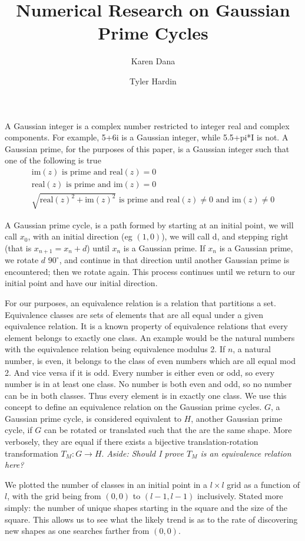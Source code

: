 \documentclass{article}
\title{Numerical Research on Gaussian Prime Cycles}
\author{Karen Dana \and Tyler Hardin}
\begin{document}
	\maketitle
	
A Gaussian integer is a complex number restricted to integer real and complex components. For example, 5+6i is a Gaussian integer, while 5.5+pi*I is not. A Gaussian prime, for the purposes of this paper, is a Gaussian integer such that one of the following is true
\begin{gather*}
  \mbox{im}(z) \mbox{ is prime and } \mbox{real}(z) = 0 \\
  \mbox{real}(z) \mbox{ is prime and } \mbox{im}(z) = 0 \\
  \sqrt{\mbox{real}(z)^2 + \mbox{im}(z)^2} \mbox{ is prime and } \mbox{real}(z) \neq 0 \mbox{ and } \mbox{im}(z) \neq 0
\end{gather*}
  
A Gaussian prime cycle, is a path formed by starting at an initial point, we will call $x_0$, with an initial direction (eg $(1,0)$), we will call d, and stepping right (that is $x_{n+1}=x_n + d$) until $x_n$ is a Gaussian prime. If $x_n$ is a Gaussian prime, we rotate $d$ $90^{\circ}$, and continue in that direction until another Gaussian prime is encountered; then we rotate again. This process continues until we return to our initial point and have our initial direction.

For our purposes, an equivalence relation is a relation that partitions a set. 
Equivalence classes are sets of elements that are all equal under a given equivalence relation. It is a known property of equivalence relations that every element belongs to exactly one class.
An example would be the natural numbers with the equivalence relation being equivalence modulus 2.
If $n$, a natural number, is even, it belongs to the class of even numbers which are all equal mod 2.
And vice versa if it is odd. Every number is either even or odd, so every number is in at least one class. No number is both even and odd, so no number can be in both classes. Thus every element is in exactly one class.
We use this concept to define an equivalence relation on the Gaussian prime cycles.
$G$, a Gaussian prime cycle, is considered equivalent to $H$, another Gaussian prime cycle, if $G$ can be rotated or translated such that the are the same shape.
More verbosely, they are equal if there exists a bijective translation-rotation transformation $T_M:G \to H$. \textit{Aside: Should I prove $T_M$ is an equivalence relation here?}

We plotted the number of classes in an initial point in a $l \times l$ grid as a function of $l$, with the grid being from $(0,0)$ to $(l-1,l-1)$ inclusively. Stated more simply: the number of unique shapes starting in the square and the size of the square. This allows us to see what the likely trend is as to the rate of discovering new shapes as one searches farther from $(0,0)$.
\end{document}

